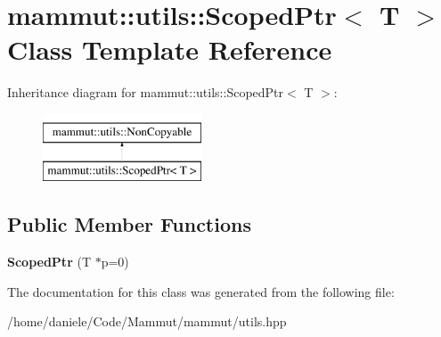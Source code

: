 \hypertarget{classmammut_1_1utils_1_1ScopedPtr}{\section{mammut\-:\-:utils\-:\-:Scoped\-Ptr$<$ T $>$ Class Template Reference}
\label{classmammut_1_1utils_1_1ScopedPtr}
}
Inheritance diagram for mammut\-:\-:utils\-:\-:Scoped\-Ptr$<$ T $>$\-:\begin{figure}[H]
\begin{center}
\leavevmode
\includegraphics[height=2.000000cm]{classmammut_1_1utils_1_1ScopedPtr}
\end{center}
\end{figure}
\subsection*{Public Member Functions}
\begin{DoxyCompactItemize}
\item 
\hypertarget{classmammut_1_1utils_1_1ScopedPtr_a2cbd722886ea02740ad3b646f18df6fb}{{\bfseries Scoped\-Ptr} (T $\ast$p=0)}\label{classmammut_1_1utils_1_1ScopedPtr_a2cbd722886ea02740ad3b646f18df6fb}

\end{DoxyCompactItemize}


The documentation for this class was generated from the following file\-:\begin{DoxyCompactItemize}
\item 
/home/daniele/\-Code/\-Mammut/mammut/utils.\-hpp\end{DoxyCompactItemize}
